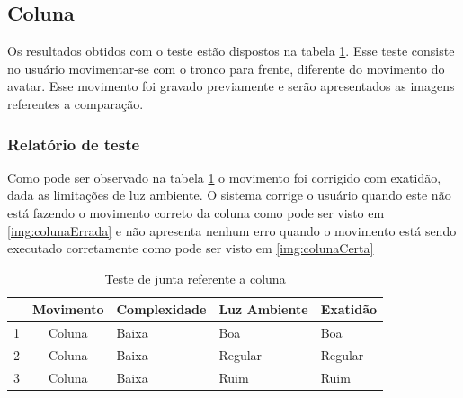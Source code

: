  \subsection{Coluna}\label{sub:coluna}
  Os resultados obtidos com o teste estão dispostos na tabela \ref{tab:coluna}. Esse teste consiste no usuário movimentar-se com o tronco para frente, diferente do movimento do avatar. Esse movimento
  foi gravado previamente e serão apresentados as imagens referentes a comparação.

  \subsubsection{Relatório de teste}\label{sub:coluna}
  Como pode ser observado na tabela \ref{tab:coluna} o movimento foi corrigido com exatidão, dada as limitações de luz ambiente. O sistema corrige o usuário quando este
  não está fazendo o movimento correto da coluna como pode ser visto em \ref{img:colunaErrada} e não apresenta nenhum erro quando o movimento está sendo executado
  corretamente como pode ser visto em \ref{img:colunaCerta}

  \begin{table}[H]
  \centering
  \caption{Teste de junta referente a coluna}
  \label{tab:coluna}
  \begin{tabular}{@{}|c|c|l|l|l|@{}}
  \toprule
  \multicolumn{1}{|l|}{ } & \multicolumn{1}{l|}{\textbf{Movimento}} & \textbf{Complexidade} & \textbf{Luz Ambiente} & \textbf{Exatidão} \\ \midrule
  1                                 & Coluna                     & Baixa                 & Boa                   & Boa               \\ \midrule
  2                                 & Coluna                     & Baixa                 & Regular               & Regular           \\ \midrule
  3                                 & Coluna                     & Baixa                 & Ruim                  & Ruim              \\ \bottomrule
  \end{tabular}
  \end{table}

